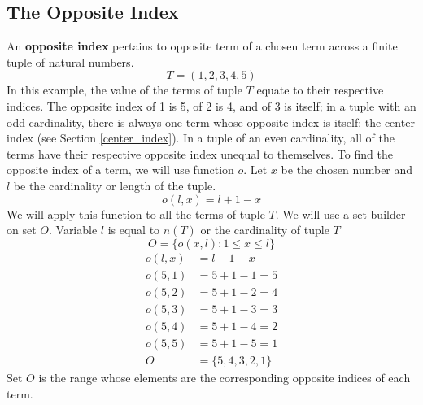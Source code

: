 \documentclass[letterpaper, twoside,12pt]{article}
\begin{document}
    \subsection{The Opposite Index}
    An \textbf{opposite index} pertains to opposite term of a chosen term across a finite tuple of natural numbers.
    \begin{equation*}
        T = (1,2,3,4,5)
    \end{equation*}
    In this example, the value of the terms of tuple $T$ equate to their respective indices. The opposite index of 1 is 5, of 2 is 4, and of 3 is itself; in a tuple with an odd cardinality, there is always one term whose opposite index is itself: the center index (see Section \ref{center_index}). In a tuple of an even cardinality, all of the terms have their respective opposite index unequal to themselves. To find the opposite index of a term, we will use function $o$. Let $x$ be the chosen number and $l$ be the cardinality or length of the tuple.
    \begin{equation}
        o(l,x) = l + 1 - x
    \end{equation}
    We will apply this function to all the terms of tuple $T$. We will use a set builder on set $O$. Variable $l$ is equal to $n(T)$ or the cardinality of tuple $T$
    \begin{equation*}
        O = \{ o(x,l) : 1 \leq x \leq l\}
    \end{equation*}
    \begin{equation*}
        \begin{split}
            o(l,x) &= l - 1 - x \\
            o(5,1) &= 5 + 1 - 1 = 5 \\
            o(5,2) &= 5 + 1 - 2 = 4 \\
            o(5,3) &= 5 + 1 - 3 = 3 \\
            o(5,4) &= 5 + 1 - 4 = 2 \\
            o(5,5) &= 5 + 1 - 5 = 1 \\
            O &= \{5,4,3,2,1\}
        \end{split}
    \end{equation*}
    Set $O$ is the range whose elements are the corresponding opposite indices of each term.
\end{document}

